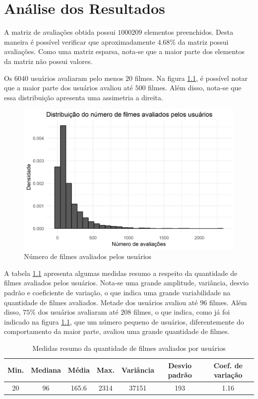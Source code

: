 \documentclass[12pt,a4paper,header]{abnt}
\begin{document}
\chapter{Análise dos Resultados}

A matriz de avaliações obtida possui $\num{1000209}$ elementos preenchidos. Desta maneira é possível verificar que aproximadamente $4.68\%$ da matriz possui avaliações. Como uma matriz esparsa, nota-se que a maior parte dos elementos da matriz não possui valores.

Os $6040$ usuários avaliaram pelo menos $20$ filmes. Na figura \ref{hist_num_ratings}, é possível notar que a maior parte dos usuários avaliou até $500$ filmes. Além disso, nota-se que essa distribuição apresenta uma assimetria a direita.

\begin{figure}[h]
\centering
\includegraphics[]{../R/img/Distribuicao_ratings.png}
\caption{Número de filmes avaliados pelos usuários}
\label{hist_num_ratings}
\end{figure}

A tabela \ref{resumo_rating} apresenta algumas medidas resumo a respeito da quantidade de filmes avaliados pelos usuários. Nota-se uma grande amplitude, variância, desvio padrão e coeficiente de variação, o que indica uma grande variabilidade na quantidade de filmes avaliados. Metade dos usuários avaliou até $96$ filmes. Além disso, $75\%$ dos usuários avaliaram até $208$ filmes, o que indica, como já foi indicado na figura \ref{hist_num_ratings}, que um número pequeno de usuários, diferentemente do comportamento da maior parte, avaliou uma grande quantidade de filmes.

\begin{table}[h]
\caption{Medidas resumo da quantidade de filmes avaliados por usuários}
\label{resumo_rating}
\centering
\begin{tabular}{@{}ccccccc@{}}
\toprule
\textbf{Min.} & \textbf{Mediana} & \textbf{Média} & \textbf{Max.} & \textbf{Variância} & \textbf{Desvio padrão} & \textbf{Coef. de variação} \\ \midrule
20            & 96               & 165.6          & 2314          & 37151              & 193                    & 1.16                       \\ \bottomrule
\end{tabular}
\end{table}
\end{document}

